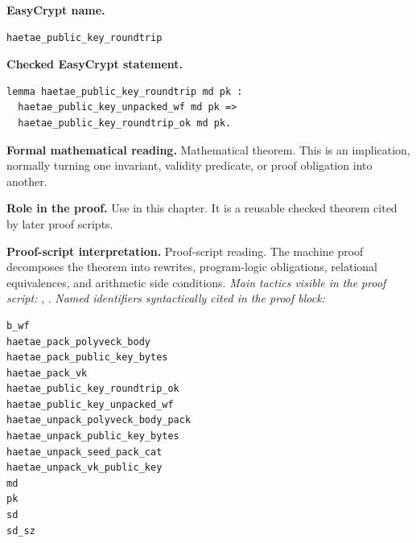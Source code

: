 \begin{formaltheorem}
\noindent\textbf{EasyCrypt name.}
\begin{lstlisting}[language=EasyCrypt,basicstyle=\ttfamily\scriptsize]
haetae_public_key_roundtrip
\end{lstlisting}
\noindent\textbf{Checked EasyCrypt statement.}
\begin{lstlisting}[language=EasyCrypt,basicstyle=\ttfamily\scriptsize]
lemma haetae_public_key_roundtrip md pk :
  haetae_public_key_unpacked_wf md pk =>
  haetae_public_key_roundtrip_ok md pk.
\end{lstlisting}
\noindent\textbf{Formal mathematical reading.}
Mathematical theorem. This is an implication, normally turning one invariant, validity predicate, or proof obligation into another.

\noindent\textbf{Role in the proof.}
Use in this chapter. It is a reusable checked theorem cited by later proof scripts.

\noindent\textbf{Proof-script interpretation.}
Proof-script reading. The machine proof decomposes the theorem into rewrites, program-logic obligations, relational equivalences, and arithmetic side conditions.
\emph{Main tactics visible in the proof script:} , .
\emph{Named identifiers syntactically cited in the proof block:}
\begin{lstlisting}[language=EasyCrypt,basicstyle=\ttfamily\scriptsize]
b_wf
haetae_pack_polyveck_body
haetae_pack_public_key_bytes
haetae_pack_vk
haetae_public_key_roundtrip_ok
haetae_public_key_unpacked_wf
haetae_unpack_polyveck_body_pack
haetae_unpack_public_key_bytes
haetae_unpack_seed_pack_cat
haetae_unpack_vk_public_key
md
pk
sd
sd_sz
\end{lstlisting}

\end{formaltheorem}

